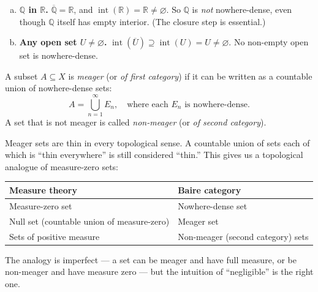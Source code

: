 \begin{example}
\label{ex:not-nowhere-dense}
\begin{enumerate}[(a)]
  \item \textbf{$\mathbb{Q}$ in $\mathbb{R}$.}
        $\overline{\mathbb{Q}} = \mathbb{R}$, and
        $\operatorname{int}(\mathbb{R}) = \mathbb{R} \neq \varnothing$.
        So $\mathbb{Q}$ is \emph{not} nowhere-dense,
        even though $\mathbb{Q}$ itself has empty interior.
        (The closure step is essential.)

  \item \textbf{Any open set $U \neq \varnothing$.}
        $\operatorname{int}(\overline{U}) \supseteq \operatorname{int}(U) = U \neq \varnothing$.
        No non-empty open set is nowhere-dense.
\end{enumerate}
\end{example}

\begin{tcolorbox}[colback=propbox, colframe=propborder, arc=2pt,
  left=6pt, right=6pt, top=4pt, bottom=4pt,
  title={\small\textbf{Definition (Meager / First Category)}},
  fonttitle=\small\bfseries]
\begin{definition}
\label{def:meager}
A subset $A \subseteq X$ is \emph{meager} (or \emph{of first category})
if it can be written as a countable union of nowhere-dense sets:
\[
A = \bigcup_{n=1}^{\infty} E_n,
\quad \text{where each } E_n \text{ is nowhere-dense.}
\]
A set that is not meager is called \emph{non-meager} (or
\emph{of second category}).
\end{definition}
\end{tcolorbox}

\begin{remark*}
Meager sets are thin in every topological sense.
A countable union of sets each of which is ``thin everywhere'' is
still considered ``thin.''
This gives us a topological analogue of measure-zero sets:
\begin{center}
\begin{tabular}{l l}
\toprule
\textbf{Measure theory} & \textbf{Baire category} \\
\midrule
Measure-zero set & Nowhere-dense set \\
Null set (countable union of measure-zero) & Meager set \\
Sets of positive measure & Non-meager (second category) sets \\
\bottomrule
\end{tabular}
\end{center}
The analogy is imperfect --- a set can be meager and have full measure,
or be non-meager and have measure zero --- but the intuition of
``negligible'' is the right one.
\end{remark*}

